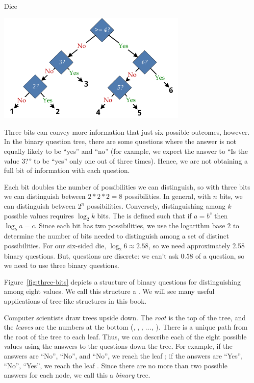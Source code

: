 \begin{example}{Dice}
\begin{center}
\includegraphics[width=3.7in]{figures/sixchoices-better.pdf}
\end{center}

Three bits can convey more information that just six possible outcomes, however.  In the binary question tree, there are some questions where the answer is not equally likely to be ``yes'' and ``no'' (for example, we expect the answer to ``Is the value 3?'' to be ``yes'' only one out of three times).  Hence, we are not obtaining a full bit of information with each question.  

Each bit doubles the number of possibilities we can distinguish, so with three bits we can distinguish between $2 * 2 * 2 = 8$ possibilities.  In general, with $n$ bits, we can distinguish between $2^n$ possibilities.  Conversely, distinguishing among $k$ possible values requires $\log_2 k$ bits.  The  is defined such that if $a=b^c$ then $\log_b a = c$.  Since each bit has two possibilities, we use the logarithm base 2 to determine the number of bits needed to distinguish among a set of distinct possibilities.
For our six-sided die, $\log_2 6 \approx 2.58$, so we need approximately 2.58 binary questions.  But, questions are discrete: we can't ask $0.58$ of a question, so we need to use three binary questions.
\end{example}

 Figure~\ref{fig:three-bits} depicts a structure of binary questions for distinguishing among eight values.  We call this structure a .  We will see many useful applications of tree-like structures in this book.  

Computer scientists draw trees upside down.  The \emph{root} is the top of the tree, and the \emph{leaves} are the numbers at the bottom (, , , $\ldots$, ).  There is a unique path from the root of the tree to each leaf.  Thus, we can describe each of the eight possible values using the answers to the questions down the tree.  For example, if the answers are ``No'', ``No'', and ``No'', we reach the leaf ; if the answers are ``Yes'', ``No'', ``Yes'', we reach the leaf .  Since there are no more than two possible answers for each node, we call this a \emph{binary} tree.

